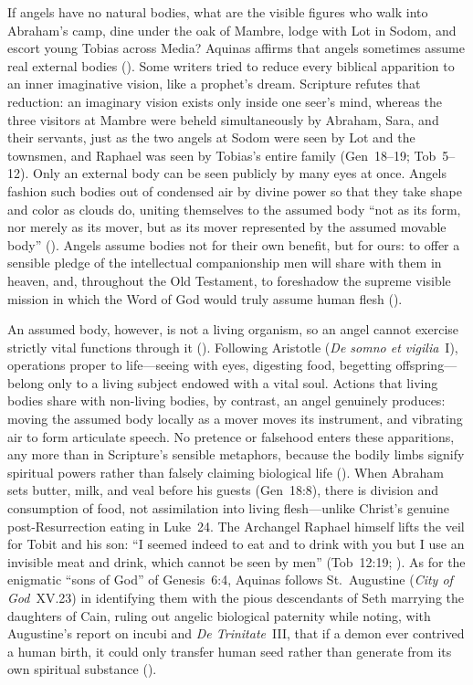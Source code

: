 If angels have no natural bodies, what are the visible figures who walk into Abraham's camp, dine under the oak of Mambre, lodge with Lot in Sodom, and escort young Tobias across Media? Aquinas affirms that angels sometimes assume real external bodies (). Some writers tried to reduce every biblical apparition to an inner imaginative vision, like a prophet's dream. Scripture refutes that reduction: an imaginary vision exists only inside one seer's mind, whereas the three visitors at Mambre were beheld simultaneously by Abraham, Sara, and their servants, just as the two angels at Sodom were seen by Lot and the townsmen, and Raphael was seen by Tobias's entire family (Gen~18--19; Tob~5--12). Only an external body can be seen publicly by many eyes at once. Angels fashion such bodies out of condensed air by divine power so that they take shape and color as clouds do, uniting themselves to the assumed body ``not as its form, nor merely as its mover, but as its mover represented by the assumed movable body'' (). Angels assume bodies not for their own benefit, but for ours: to offer a sensible pledge of the intellectual companionship men will share with them in heaven, and, throughout the Old Testament, to foreshadow the supreme visible mission in which the Word of God would truly assume human flesh ().

An assumed body, however, is not a living organism, so an angel cannot exercise strictly vital functions through it (). Following Aristotle (\emph{De somno et vigilia}~I), operations proper to life---seeing with eyes, digesting food, begetting offspring---belong only to a living subject endowed with a vital soul. Actions that living bodies share with non-living bodies, by contrast, an angel genuinely produces: moving the assumed body locally as a mover moves its instrument, and vibrating air to form articulate speech. No pretence or falsehood enters these apparitions, any more than in Scripture's sensible metaphors, because the bodily limbs signify spiritual powers rather than falsely claiming biological life (). When Abraham sets butter, milk, and veal before his guests (Gen~18:8), there is division and consumption of food, not assimilation into living flesh---unlike Christ's genuine post-Resurrection eating in Luke~24. The Archangel Raphael himself lifts the veil for Tobit and his son: ``I seemed indeed to eat and to drink with you but I use an invisible meat and drink, which cannot be seen by men'' (Tob~12:19; ). As for the enigmatic ``sons of God'' of Genesis~6:4, Aquinas follows St.~Augustine (\emph{City of God}~XV.23) in identifying them with the pious descendants of Seth marrying the daughters of Cain, ruling out angelic biological paternity while noting, with Augustine's report on incubi and \emph{De Trinitate}~III, that if a demon ever contrived a human birth, it could only transfer human seed rather than generate from its own spiritual substance ().

